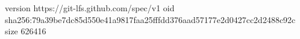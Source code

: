version https://git-lfs.github.com/spec/v1
oid sha256:79a39be7dc85d550e41a9817faa25fffdd376aad57177e2d0427cc2d2488c92c
size 626416
